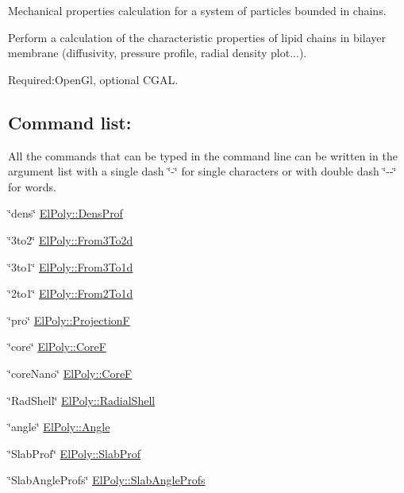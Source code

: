 \-Mechanical properties calculation for a system of particles bounded in chains. \par
 \-Perform a calculation of the characteristic properties of lipid chains in bilayer membrane (diffusivity, pressure profile, radial density plot...).\par
 \-Required\-:\-Open\-Gl, optional \-C\-G\-A\-L.\hypertarget{ElPoly_page_CommandList_section}{}\subsection{\-Command list\-:}\label{ElPoly_page_CommandList_section}
\-All the commands that can be typed in the command line can be written in the argument list with a single dash \char`\"{}-\/\char`\"{} for single characters or with double dash \char`\"{}-\/-\/\char`\"{} for words. 
\begin{DoxyItemize}
\item \char`\"{}dens\char`\"{} \hyperlink{classElPoly_a70302b7bbfa248d2963323bc63a4a292}{\-El\-Poly\-::\-Dens\-Prof} 
\item \char`\"{}3to2\char`\"{} \hyperlink{classElPoly_a4e71c4abd7c3ed37f29a8fcae064fd32}{\-El\-Poly\-::\-From3\-To2d} 
\item \char`\"{}3to1\char`\"{} \hyperlink{classElPoly_a0b9109dcecbeec17c94472b5e638580a}{\-El\-Poly\-::\-From3\-To1d} 
\item \char`\"{}2to1\char`\"{} \hyperlink{classElPoly_a30e6658740047a2fdd996e2b843e91b9}{\-El\-Poly\-::\-From2\-To1d} 
\item \char`\"{}pro\char`\"{} \hyperlink{classElPoly_aa2dbcd635807df0929968ec8932631ab}{\-El\-Poly\-::\-Projection\-F} 
\item \char`\"{}core\char`\"{} \hyperlink{classElPoly_a04dd79cb2f5e46ae301b6dc1d57db28a}{\-El\-Poly\-::\-Core\-F} 
\item \char`\"{}core\-Nano\char`\"{} \hyperlink{classElPoly_a04dd79cb2f5e46ae301b6dc1d57db28a}{\-El\-Poly\-::\-Core\-F} 
\item \char`\"{}\-Rad\-Shell\char`\"{} \hyperlink{classElPoly_a64e019ffaa4437477ea433f7b5113341}{\-El\-Poly\-::\-Radial\-Shell} 
\item \char`\"{}angle\char`\"{} \hyperlink{classElPoly_ae3aab8086f988eecdd12b8f29f45a56a}{\-El\-Poly\-::\-Angle} 
\item \char`\"{}\-Slab\-Prof\char`\"{} \hyperlink{classElPoly_a3db31f8490f0ea101281679a270e72fe}{\-El\-Poly\-::\-Slab\-Prof} 
\item \char`\"{}\-Slab\-Angle\-Profs\char`\"{} \hyperlink{classElPoly_a4192d526e79a4c1e0b4910a4f35720c4}{\-El\-Poly\-::\-Slab\-Angle\-Profs} 

\end{DoxyItemize}
